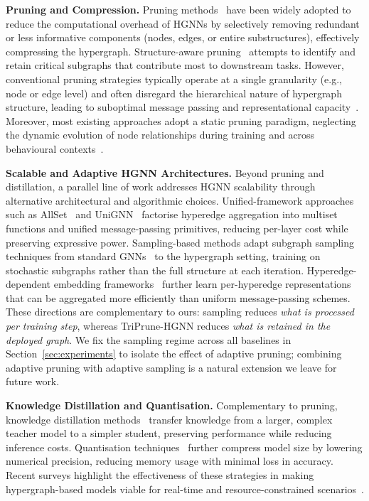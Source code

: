 \documentclass[10pt]{article}
\theoremstyle{plain}
\theoremstyle{definition}
\begin{document}
\textbf{Pruning and Compression.} 
Pruning methods~\citep{lee2023fast, chen2024uncovering, he2023structured} have been widely adopted to reduce the computational overhead of HGNNs by selectively removing redundant or less informative components (nodes, edges, or entire substructures), effectively compressing the hypergraph. Structure-aware pruning~\citep{zheng2022savit, jiang2023structure} attempts to identify and retain critical subgraphs that contribute most to downstream tasks. However, conventional pruning strategies typically operate at a single granularity (e.g., node or edge level) and often disregard the hierarchical nature of hypergraph structure, leading to suboptimal message passing and representational capacity~\citep{cai2022hypergraph}. Moreover, most existing approaches adopt a static pruning paradigm, neglecting the dynamic evolution of node relationships during training and across behavioural contexts~\citep{liang2021pruning}.

\textbf{Scalable and Adaptive HGNN Architectures.}
Beyond pruning and distillation, a parallel line of work addresses HGNN scalability through alternative architectural and algorithmic choices. Unified-framework approaches such as AllSet~\citep{chien2022you} and UniGNN~\citep{huang2021unignn} factorise hyperedge aggregation into multiset functions and unified message-passing primitives, reducing per-layer cost while preserving expressive power. Sampling-based methods adapt subgraph sampling techniques from standard GNNs~\citep{zeng2019graphsaint} to the hypergraph setting, training on stochastic subgraphs rather than the full structure at each iteration. Hyperedge-dependent embedding frameworks~\citep{dong2020hnhn} further learn per-hyperedge representations that can be aggregated more efficiently than uniform message-passing schemes. These directions are complementary to ours: sampling reduces \emph{what is processed per training step}, whereas TriPrune-HGNN reduces \emph{what is retained in the deployed graph}. We fix the sampling regime across all baselines in Section~\ref{sec:experiments} to isolate the effect of adaptive pruning; combining adaptive pruning with adaptive sampling is a natural extension we leave for future work.

\textbf{Knowledge Distillation and Quantisation.} 
Complementary to pruning, knowledge distillation methods~\citep{forouzandeh2025distillhgnn, feng2024lighthgnn, yu2024meta, forouzandeh2025SHARP} transfer knowledge from a larger, complex teacher model to a simpler student, preserving performance while reducing inference costs. Quantisation techniques~\citep{hubara2018quantized} further compress model size by lowering numerical precision, reducing memory usage with minimal loss in accuracy. Recent surveys highlight the effectiveness of these strategies in making hypergraph-based models viable for real-time and resource-constrained scenarios~\citep{cheng2024survey, gholami2022surveycompcat, zhou2018adaptive}.
\end{document}
